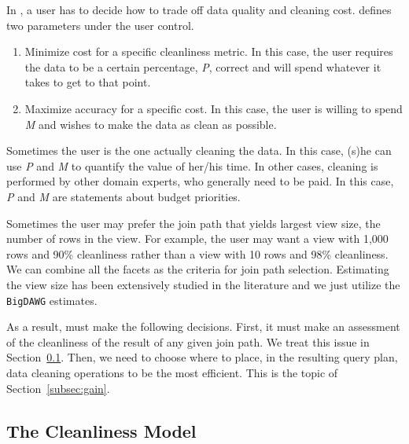 In \dcv, a user has to decide how to trade off data quality and cleaning cost. 
\dcv defines two parameters under the user control.

\begin{enumerate}
\item Minimize cost for a specific cleanliness metric. In this case, the user requires the data to be a certain percentage, \emph{P}, correct and will spend whatever it takes to get to that point.

\item Maximize accuracy for a specific cost. In this case, the user is willing to spend \emph{M} and wishes to make the data as clean as possible.
\end{enumerate}

Sometimes the user is the one actually cleaning the data. In this case, (s)he can use \emph{P} and \emph{M} to quantify the value of her/his time. 
In other cases, cleaning is performed by other domain experts, who generally need to be paid. In this case, \emph{P} and \emph{M} are statements about budget priorities.

Sometimes the user may prefer the join path that yields largest view size, \ie the number of rows in the view. 
For example, the user may want a view with 1,000 rows and 90\% cleanliness rather than a view with 10 rows and 98\% cleanliness. 
We can combine all the facets as the criteria for join path selection. 
Estimating the view size has been extensively studied in the literature and we just utilize the \texttt{BigDAWG} estimates.

As a result, \dcv must make the following decisions. First, it must make an assessment of the cleanliness of the result of any given join path. We treat this issue in Section~\ref{subsec:model}. Then, we need to choose where to place, in the resulting query plan, data cleaning operations to be the most efficient. This is the topic of Section~\ref{subsec:gain}.


\subsection{The Cleanliness Model}\label{subsec:model}

